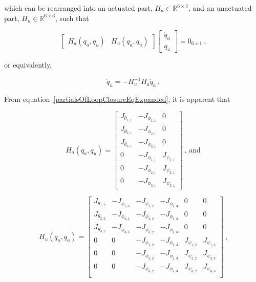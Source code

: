 \documentclass{report}
\begin{document}
which can be rearranged into an actuated part, $H_{a} \in \mathbb{R}^{6\times 3}$, and an unactuated part, $H_{u} \in \mathbb{R}^{6\times 6}$, such that

\begin{equation}
\begin{bmatrix}
H_{a}(q_{a},q_{u}) & H_{u}(q_{a},q_{u})
\end{bmatrix}
\begin{bmatrix}
\dot{q}_{a}\\
\dot{q}_{u}
\end{bmatrix} = 0_{6\times 1}\ \text{,}
\end{equation}

or equivalently,

\begin{equation}
\dot{q}_{u} = -H_{u}^{-1}H_{a}\dot{q}_{a}\ \text{.}
\end{equation}

From equation~\ref{partialsOfLoopClosureEqExpanded}, it is apparent that

\begin{equation}
H_{a}(q_{a},q_{u}) = 
\begin{bmatrix}
J_{\theta_{1,1}} & -J_{\phi_{1,1}} & 0 \\
J_{\theta_{2,1}} & -J_{\phi_{2,1}} & 0 \\
J_{\theta_{3,1}} & -J_{\phi_{3,1}} & 0 \\
0 & -J_{\phi_{1,1}} & J_{\psi_{1,1}} \\
0 & -J_{\phi_{2,1}} & J_{\psi_{2,1}} \\
0 & -J_{\phi_{3,1}} & J_{\psi_{3,1}}
\end{bmatrix}\ \text{, and}
\end{equation}

\begin{equation}
H_{u}(q_{a},q_{u}) = 
\begin{bmatrix}
J_{\theta_{1,2}} & -J_{\phi_{1,3}} & -J_{\phi_{1,2}} & -J_{\phi_{1,3}} & 0 & 0\\
J_{\theta_{2,2}} & -J_{\phi_{2,3}} & -J_{\phi_{2,2}} & -J_{\phi_{2,3}} & 0 & 0\\
J_{\theta_{3,2}} & -J_{\phi_{3,3}} & -J_{\phi_{3,2}} & -J_{\phi_{3,3}} & 0 & 0\\
0 & 0 & -J_{\phi_{1,2}} & -J_{\phi_{1,3}} & J_{\psi_{1,2}} & J_{\psi_{1,3}}\\
0 & 0 & -J_{\phi_{2,2}} & -J_{\phi_{2,3}} & J_{\psi_{2,2}} & J_{\psi_{2,3}}\\
0 & 0 & -J_{\phi_{3,2}} & -J_{\phi_{3,3}} & J_{\psi_{3,2}} & J_{\psi_{3,3}}\\
\end{bmatrix}\ \text{,}
\end{equation}
\end{document}
